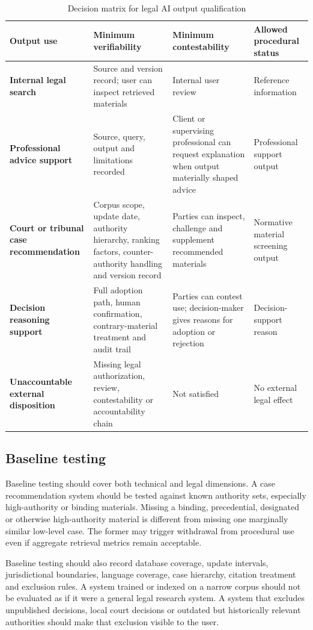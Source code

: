 \documentclass[12pt,a4paper]{article}
\begin{document}
\begin{table}[htbp]
\centering
\caption{Decision matrix for legal AI output qualification}
\label{tab:decision-matrix}
\renewcommand{\arraystretch}{1.2}
\begin{tabularx}{\textwidth}{>{\bfseries}p{3.1cm}YYY}
\toprule
Output use & Minimum verifiability & Minimum contestability & Allowed procedural status \\
\midrule
Internal legal search & Source and version record; user can inspect retrieved materials & Internal user review & Reference information \\
Professional advice support & Source, query, output and limitations recorded & Client or supervising professional can request explanation when output materially shaped advice & Professional support output \\
Court or tribunal case recommendation & Corpus scope, update date, authority hierarchy, ranking factors, counter-authority handling and version record & Parties can inspect, challenge and supplement recommended materials & Normative material screening output \\
Decision reasoning support & Full adoption path, human confirmation, contrary-material treatment and audit trail & Parties can contest use; decision-maker gives reasons for adoption or rejection & Decision-support reason \\
Unaccountable external disposition & Missing legal authorization, review, contestability or accountability chain & Not satisfied & No external legal effect \\
\bottomrule
\end{tabularx}
\end{table}

\subsection{Baseline testing}

Baseline testing should cover both technical and legal dimensions. A case recommendation system should be tested against known authority sets, especially high-authority or binding materials. Missing a binding, precedential, designated or otherwise high-authority material is different from missing one marginally similar low-level case. The former may trigger withdrawal from procedural use even if aggregate retrieval metrics remain acceptable.

Baseline testing should also record database coverage, update intervals, jurisdictional boundaries, language coverage, case hierarchy, citation treatment and exclusion rules. A system trained or indexed on a narrow corpus should not be evaluated as if it were a general legal research system. A system that excludes unpublished decisions, local court decisions or outdated but historically relevant authorities should make that exclusion visible to the user.
\end{document}
